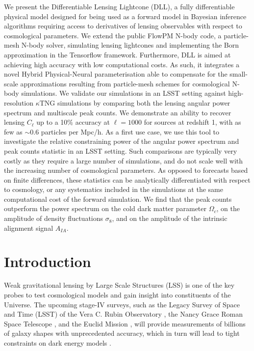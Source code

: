 \documentclass{aa}
\begin{document}
  \abstract
   {}
   {We present the Differentiable Lensing Lightcone (DLL), a fully differentiable physical model designed for being used as a forward model in Bayesian inference algorithms requiring access to derivatives of lensing observables with respect to cosmological parameters. 
}
   {We extend the public FlowPM N-body code, a particle-mesh N-body solver, simulating lensing lightcones and implementing the Born approximation in the Tensorflow framework. Furthermore, DLL is aimed at achieving high accuracy with low computational costs. As such, it integrates a novel Hybrid Physical-Neural parameterisation able to compensate for the small-scale approximations resulting from particle-mesh schemes for cosmological N-body simulations.
We validate our simulations in an LSST setting against high-resolution $\kappa$TNG simulations by comparing both the lensing angular power spectrum and multiscale peak counts. We demonstrate an ability to recover lensing $C_\ell$ up to a 10\% accuracy at $\ell=1000$ for sources at redshift 1, with as few as $\sim 0.6$ particles per Mpc/h. 
As a first use case, we use this tool to investigate the relative constraining power of the angular power spectrum and peak counts statistic in an LSST setting.
Such comparisons are typically very costly as they require a large number of simulations, and do not scale well with the increasing number of cosmological parameters.  
As opposed to forecasts based on finite differences, these statistics can be analytically differentiated with respect to cosmology, or any systematics included in the simulations at the same computational cost of the forward simulation. }
   {We find that the peak counts outperform the power spectrum on the cold dark matter parameter $\Omega_c$, on the amplitude of density fluctuations $\sigma_8$, and on the
amplitude of the intrinsic alignment signal $A_{IA}$.}
   {}


   \maketitle
%

\section{Introduction}
Weak gravitational lensing by Large Scale Structures (LSS) is one of the key probes to test cosmological models and gain insight into constituents of the Universe. The upcoming stage-IV surveys, such as the Legacy Survey of Space and Time (LSST) of the Vera C. Rubin Observatory \cite{ivezic2019lsst}, the Nancy Grace Roman Space Telescope \citep{spergel2015wide}, and  the Euclid Mission \citep{laureijs2011euclid}, will provide measurements of billions of galaxy shapes with unprecedented accuracy, which in turn will lead to tight constraints on dark energy models \citep[e.g.][]{mandelbaum2018lsst}.
\end{document}
